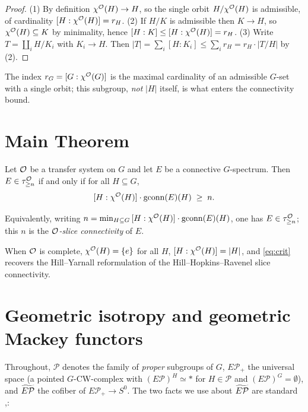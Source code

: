 \begin{proof}
(1) By definition $\chi^{\mathcal{O}}(H)\to H$, so the single orbit $H/\chi^{\mathcal{O}}(H)$ is
admissible, of cardinality $[H:\chi^{\mathcal{O}}(H)]=r_H$.
(2) If $H/K$ is admissible then $K\to H$, so $\chi^{\mathcal{O}}(H)\subseteq K$ by
minimality, hence $[H:K]\le[H:\chi^{\mathcal{O}}(H)]=r_H$.
(3) Write $T=\coprod_i H/K_i$ with $K_i\to H$. Then
$|T|=\sum_i[H:K_i]\le \sum_i r_H = r_H\cdot|T/H|$ by (2).
\end{proof}

The index $r_G=[G:\chi^{\mathcal{O}}(G)]$ is the maximal cardinality of an admissible $G$-set
with a single orbit; this subgroup, \emph{not} $|H|$ itself, is what enters the
connectivity bound.

\section*{Main Theorem}

\begin{qfivetheorem}\label{thm:main}
Let $\mathcal{O}$ be a transfer system on $G$ and let $E$ be a connective $G$-spectrum.
Then $E\in\tau^{\mathcal{O}}_{\ge n}$ if and only if for all $H\subseteq G$,
\begin{equation}\label{eq:crit}
[H:\chi^{\mathcal{O}}(H)]\cdot\operatorname{gconn}(E)(H)\;\ge\;n .
\end{equation}
\end{qfivetheorem}

Equivalently, writing
$n=\min_{H\subseteq G}\,[H:\chi^{\mathcal{O}}(H)]\cdot\operatorname{gconn}(E)(H)$, one has
$E\in\tau^{\mathcal{O}}_{\ge n}$; this $n$ is the \emph{$\mathcal{O}$-slice connectivity} of $E$.

When $\mathcal{O}$ is complete, $\chi^{\mathcal{O}}(H)=\{e\}$ for all $H$, $[H:\chi^{\mathcal{O}}(H)]=|H|$,
and \eqref{eq:crit} recovers the Hill--Yarnall reformulation \cite{HY18} of the
Hill--Hopkins--Ravenel slice connectivity.

\section*{Geometric isotropy and geometric Mackey functors}

Throughout, $\mathcal P$ denotes the family of \emph{proper} subgroups of $G$,
$E\mathcal P_+$ the universal space (a pointed $G$-CW-complex with
$(E\mathcal P)^H\simeq\ast$ for $H\in\mathcal P$ and $(E\mathcal P)^G=\emptyset$),
and $\widetilde{E\mathcal P}$ the cofiber of $E\mathcal P_+\to S^0$. The two facts we use about
$\widetilde{E\mathcal P}$ are standard \cite[\S2.5, \S6]{HillPrimer},\cite[\S2.5.2]{HHR16}:

